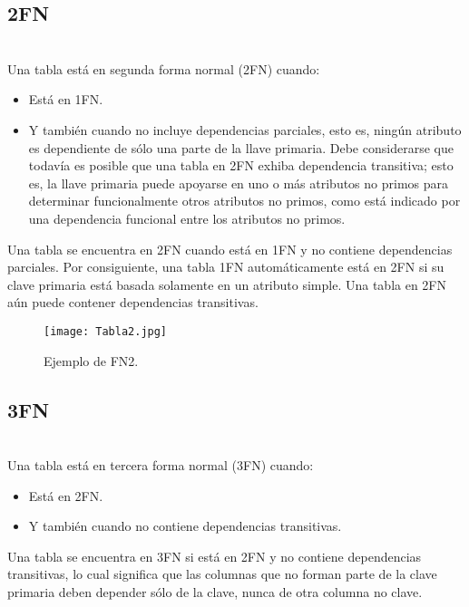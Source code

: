 \documentclass[spanish]{article}
\begin{document}
        \subsection{2FN}\\
        Una tabla está en segunda forma normal (2FN) cuando:
        \begin{itemize}
            \item Está en 1FN.
            \item Y también cuando no incluye dependencias parciales, esto es, ningún atributo es dependiente de sólo una parte de la llave primaria. Debe considerarse que todavía es posible que una tabla en 2FN exhiba dependencia transitiva; esto es, la llave primaria puede apoyarse en uno o más atributos no primos para determinar funcionalmente otros atributos no primos, como está indicado por una dependencia funcional entre los atributos no primos.
        \end{itemize}
        
        Una tabla se encuentra en 2FN cuando está en 1FN y no contiene dependencias parciales. Por consiguiente, una tabla 1FN automáticamente está en 2FN si su clave primaria está basada solamente en un atributo simple. Una tabla en 2FN aún puede contener dependencias transitivas.
        

\newpage

    \begin{figure}[h]
        \centering
        \texttt{[image: Tabla2.jpg]}
        \caption{Ejemplo de FN2.}
        \label{fig:comu}
    \end{figure}
    
 \subsection{3FN}\\
Una tabla está en tercera forma normal (3FN) cuando:

\begin{itemize}
    \item Está en 2FN.
    \item Y también cuando no contiene dependencias transitivas.
\end{itemize}

Una tabla se encuentra en 3FN si está en 2FN y no contiene dependencias transitivas, lo cual significa que las columnas que no forman parte de la clave primaria deben depender sólo de la clave, nunca de otra columna no clave. 
\end{document}
